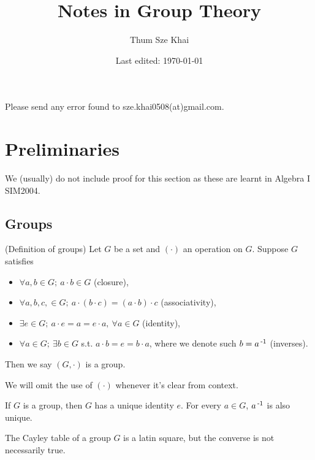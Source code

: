 \documentclass[12pt]{article}
\title{Notes in Group Theory}
\author{Thum Sze Khai}
\date{Last edited: \today}
\begin{document}
\begin{titlepage}
\thispagestyle{empty}
\maketitle

\vfill
Please send any error found to sze.khai0508(at)gmail.com.
\end{titlepage}

\newpage
\tableofcontents

\newpage

\section{Preliminaries}
We (usually) do not include proof for this section as these are learnt in Algebra I SIM2004.

\subsection{Groups}
	\begin{define}\label{definition-groups}
		(Definition of groups) Let $G$ be a set and $(\cdot)$ an operation on $G$. Suppose $G$ satisfies
		\begin{itemize}
			\item $\forall a,b \in G;\ a\cdot b\in G$ (closure),
			\item $\forall a,b,c,\in G;\ a\cdot(b\cdot c) = (a\cdot b) \cdot c$ (associativity),
			\item $\exists e\in G;\ a\cdot e=a=e\cdot a,\ \forall a\in G$ (identity),
			\item $\forall a\in G;\ \exists b\in G$ s.t. $a\cdot b=e=b\cdot a$, where we denote such $b = a\operatorname{^{-1}}$ (inverses).
		\end{itemize}

		Then we say $(G,\cdot)$ is a group. 
	\end{define}

	We will omit the use of $(\cdot)$ whenever it's clear from context.

	\begin{theorem}\label{uniqueness-of-identity-inv}
		If $G$ is a group, then $G$ has a unique identity $e$. For every $a\in G$, $a\operatorname{^{-1}}$ is also unique.
	\end{theorem}

	\begin{theorem}
		The Cayley table of a group $G$ is a latin square, but the converse is not necessarily true.
	\end{theorem}
\end{document}
